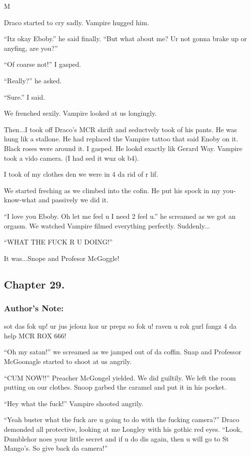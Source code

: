 M\documentclass{article}
\begin{document}
Draco started to cry sadly. Vampire hugged him.

“Itz okay Eboby.” he said finally. “But what about me? Ur not gonna brake up or anyfing, are you?”

“Of coarse not!” I gasped.

“Really?” he asked.

“Sure.” I said.

We frenched sexily. Vampire looked at us longingly.

Then...I took off Draco’s MCR shrift and seductvely took of his pants. He was hung lik a stallone. He had replaced the Vampire tattoo that said Enoby on it. Black roses were around it. I gasped. He lookd exactly lik Gerard Way. Vampire took a vido camera. (I had sed it wuz ok b4).

I took of my clothes den we were in 4 da rid of r lif.

We started freching as we climbed into the cofin. He put his spock in my you-know-what and passively we did it.

“I love you Eboby. Oh let me feel u I need 2 feel u.” he screamed as we got an orgasm. We watched Vampire filmed everything perfectly. Suddenly...

“WHAT THE FUCK R U DOING!”

It was...Snope and Profesor McGoggle!

\clearpage\nolinenumbers
\subsection*{Chapter 29.}

\subsubsection*{Author's Note: }sot das fok up! ur jus jelouz koz ur prepz so fok u! raven u rok gurl fangz 4 da help MCR ROX 666!

\textbreak
\linenumbers\resetlinenumber

“Oh my satan!” we screamed as we jamped out of da coffin. Snap and Professor McGoonagle started to shoot at us angrily.

“CUM NOW!!” Preacher McGongel yielded. We did guiltily. We left the room putting on our clothes. Snoop garbed the caramel and put it in his pocket.

“Hey what the fuck!” Vampire shooted angrily.

“Yeah buster what the fuck are u going to do with the fucking camera?” Draco demonded all protective, looking at me Longley with his gothic red eyes. “Look, Dumblehor noes your little secret and if u do dis again, then u will go to St Mango’s. So give back da camera!”
\end{document}
